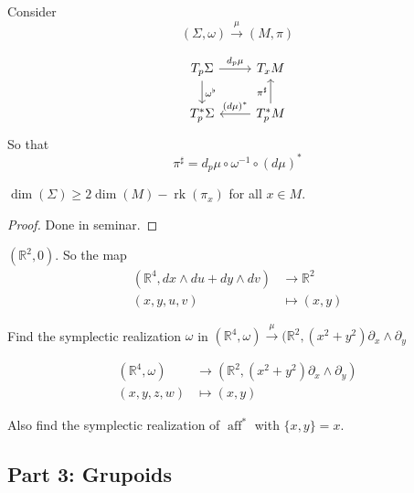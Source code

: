 Consider
\[(\Sigma,\omega) \xrightarrow{\mu}(M,\pi)\]

\[\begin{tikzcd}
	T_p\Sigma \arrow[r,"d_p\mu"]\arrow[d,"\omega^\flat"]&T_xM\\
	T_p^*\Sigma &  T^*_pM\arrow[l,"(d\mu)^*",swap]\arrow[u,"\pi ^\sharp"]
\end{tikzcd}\]
So that 
\[\pi ^\sharp=d_p\mu \circ \omega^{-1} \circ(d\mu)^*\]



\begin{lemma}\leavevmode
\(\dim (\Sigma) \geq  2 \dim (M) - \operatorname{rk}(\pi_x)\) for all \(x \in M\).
\end{lemma}

\begin{proof}\leavevmode
Done in seminar.
\end{proof}

\begin{example}\leavevmode
\((\mathbb{R}^2,0)\). So the map
\begin{align*}
	(\mathbb{R}^4,dx \wedge du + dy \wedge dv) &\longrightarrow  \mathbb{R}^2\\
	(x,y,u,v) &\longmapsto (x,y)
\end{align*}

\end{example}

\begin{exercise}\leavevmode
Find the symplectic realization \(\omega\) in \((\mathbb{R}^4, \omega ) \xrightarrow{\mu}(\mathbb{R}^2,(x^2+y^2)\partial_x \wedge \partial_y\)

\begin{align*}
	(\mathbb{R}^4, \omega) &\longrightarrow (\mathbb{R}^2,(x^2+y^2) \partial_x \wedge \partial _y) \\
	(x,y,z,w) &\longmapsto (x,y)
\end{align*}

Also find the symplectic realization of \(\operatorname{ a f f }^*\) with \(\{x,y\}=x\).
\end{exercise}

\subsection{Part 3: Grupoids}


